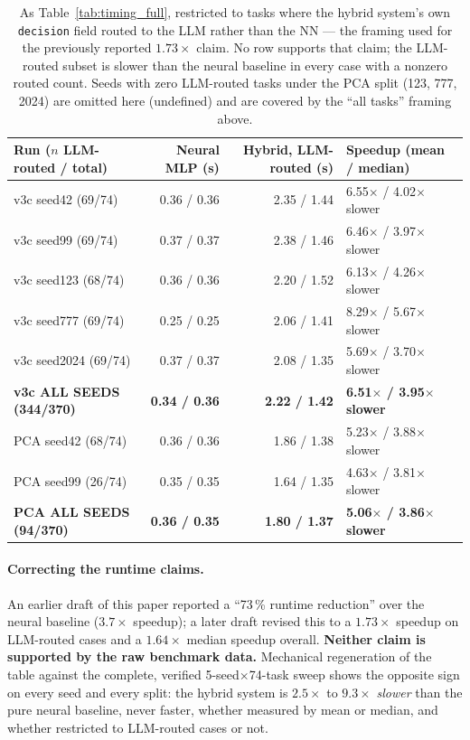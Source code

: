 \documentclass[twoside,11pt]{article}
\begin{document}
\begin{table}[htbp]
\centering
\small
\caption{As Table~\ref{tab:timing_full}, restricted to tasks where the
hybrid system's own \texttt{decision} field routed to the LLM rather than
the NN --- the framing used for the previously reported $1.73\times$
claim. No row supports that claim; the LLM-routed subset is slower than
the neural baseline in every case with a nonzero routed count. Seeds with
zero LLM-routed tasks under the PCA split (123, 777, 2024) are omitted
here (undefined) and are covered by the ``all tasks'' framing above.}
\label{tab:timing_llm_routed_full}
\begin{tabular}{lrrl}
\toprule
Run ($n$ LLM-routed / total) & Neural MLP (s) & Hybrid, LLM-routed (s) & Speedup (mean / median) \\
\midrule
v3c seed42 (69/74)  & 0.36 / 0.36 & 2.35 / 1.44 & 6.55$\times$ / 4.02$\times$ slower \\
v3c seed99 (69/74)  & 0.37 / 0.37 & 2.38 / 1.46 & 6.46$\times$ / 3.97$\times$ slower \\
v3c seed123 (68/74) & 0.36 / 0.36 & 2.20 / 1.52 & 6.13$\times$ / 4.26$\times$ slower \\
v3c seed777 (69/74) & 0.25 / 0.25 & 2.06 / 1.41 & 8.29$\times$ / 5.67$\times$ slower \\
v3c seed2024 (69/74) & 0.37 / 0.37 & 2.08 / 1.35 & 5.69$\times$ / 3.70$\times$ slower \\
\rowcolor{black!8}
\textbf{v3c ALL SEEDS (344/370)} & \textbf{0.34 / 0.36} & \textbf{2.22 / 1.42} & \textbf{6.51$\times$ / 3.95$\times$ slower} \\
PCA seed42 (68/74) & 0.36 / 0.36 & 1.86 / 1.38 & 5.23$\times$ / 3.88$\times$ slower \\
PCA seed99 (26/74) & 0.35 / 0.35 & 1.64 / 1.35 & 4.63$\times$ / 3.81$\times$ slower \\
\rowcolor{black!8}
\textbf{PCA ALL SEEDS (94/370)} & \textbf{0.36 / 0.35} & \textbf{1.80 / 1.37} & \textbf{5.06$\times$ / 3.86$\times$ slower} \\
\bottomrule
\end{tabular}
\end{table}

\paragraph{Correcting the runtime claims.}
\label{sec:correction}

An earlier draft of this paper reported a ``73\,\% runtime reduction'' over
the neural baseline ($3.7\times$ speedup); a later draft revised this to a
$1.73\times$ speedup on LLM-routed cases and a $1.64\times$ median speedup
overall. \textbf{Neither claim is supported by the raw benchmark data.}
Mechanical regeneration of the table against the complete, verified
5-seed$\times$74-task sweep shows the opposite sign on every seed and
every split: the hybrid system is $2.5\times$ to $9.3\times$
\emph{slower} than the pure neural baseline, never faster, whether
measured by mean or median, and whether restricted to LLM-routed cases or
not.
\end{document}
